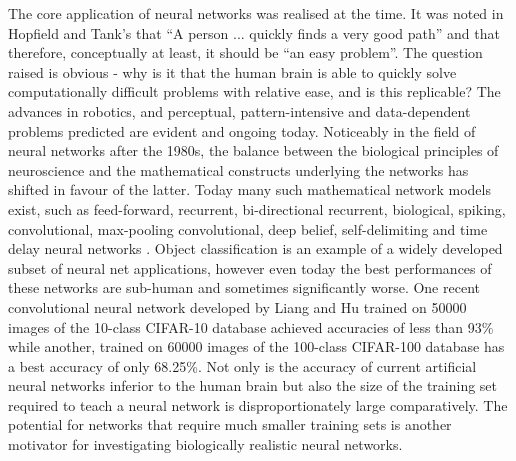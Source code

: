 \documentclass[11pt, twocolumn]{article}
\begin{document}
The core application of neural networks was realised at the time. It was noted in Hopfield and Tank's that ``A person ... quickly finds a very good path'' and that therefore, conceptually at least, it should be ``an easy problem''. The question raised is obvious - why is it that the human brain is able to quickly solve computationally difficult problems with relative ease, and is this replicable? The advances in robotics, and perceptual, pattern-intensive and data-dependent problems predicted \cite{hopfield1985neural} are evident and ongoing today. Noticeably in the field of neural networks after the 1980s, the balance between the biological principles of neuroscience and the mathematical constructs underlying the networks has shifted in favour of the latter. Today many such mathematical network models exist, such as feed-forward, recurrent, bi-directional recurrent, biological, spiking, convolutional, max-pooling convolutional, deep belief, self-delimiting and time delay neural networks \cite{schmidhuber2015deep}. Object classification is an example of a widely developed subset of neural net applications, however even today the best performances of these networks are sub-human and sometimes significantly worse. One recent convolutional neural network developed by Liang and Hu \cite{liang2015recurrent} trained on 50000 images of the 10-class \acs{CIFAR}-10 database achieved accuracies of less than 93\% while another, trained on 60000 images of the 100-class \acs{CIFAR}-100 database has a best accuracy of only 68.25\%. Not only is the accuracy of current artificial neural networks inferior to the human brain but also the size of the training set required to teach a neural network is disproportionately large comparatively. The potential for networks that require much smaller training sets is another motivator for investigating biologically realistic neural networks.
\end{document}
